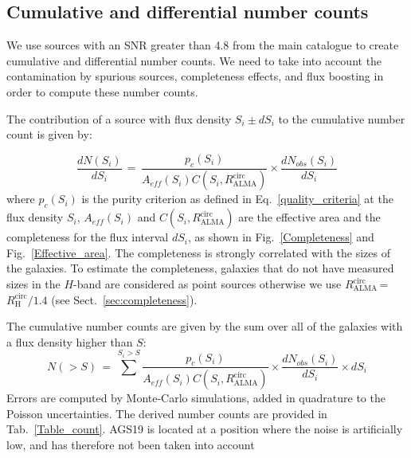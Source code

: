 \documentclass[longauth]{aa}
\begin{document}
\subsection{Cumulative and differential number counts}\label{sec:Cumulative_number_counts}

We use sources with an SNR greater than 4.8 from the main catalogue to create cumulative and differential number counts. We need to take into account the contamination by spurious sources, completeness effects, and flux boosting in order to compute these number counts. 

The contribution of a source with flux density $S_i \pm dS_i$ to the cumulative number count is given by:

\begin{equation}
\label{eq_cumulative_number_counts}
\frac{dN(S_i)}{dS_i}\,=\,\frac{p_c(S_i)}{A_{eff}(S_i)C(S_i,R_{\text{ALMA}}^{\text{circ}})}\times\frac{dN_{obs}(S_i)}{dS_i}
\end{equation}
\noindent where $p_c(S_i)$ is the purity criterion as defined in Eq.~\ref{quality_criteria} at the flux density $S_i$, $A_{eff}(S_i)$ and $C(S_i,R_{\text{ALMA}}^{\text{circ}})$ are the effective area and the completeness for the flux interval $dS_i$, as shown in Fig.~\ref{Completeness} and Fig.~\ref{Effective_area}.
The completeness is strongly correlated with the sizes of the galaxies. To estimate the completeness, galaxies that do not have measured sizes in the $H$-band \citep{van_der_Wel2012} are considered as point sources otherwise we use $R_{\text{ALMA}}^{\text{circ}}$\,=\,$R_{\text{H}}^{\text{circ}} / 1.4$ (see Sect.~\ref{sec:completeness}).

The cumulative number counts are given by the sum over all of the galaxies with a flux density higher than $S$:
\begin{equation}
N(>S)\,=\,\sum^{S_i>S} \frac{p_c(S_i)}{A_{eff}(S_i)C(S_i,R_{\text{ALMA}}^{\text{circ}})}\times\frac{dN_{obs}(S_i)}{dS_i}\times dS_i
\end{equation}
Errors are computed by Monte-Carlo simulations, added in quadrature to the Poisson uncertainties. The derived number counts are provided in Tab.~\ref{Table_count}. AGS19 is located at a position where the noise is artificially low, and has therefore not been taken into account
\end{document}
